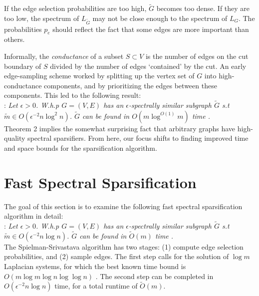 \documentclass{article}
\begin{document}
If the edge selection probabilities are too high, $\tilde{G}$ becomes too
dense. If they are too low, the spectrum of $L_{\tilde{G}}$ may not be close
enough to the spectrum of $L_G$. The probabilities $p_e$ should reflect the
fact that some edges are more important than others.

Informally, the \textit{conductance} of a subset $S \subset V$ is the number
of edges on the cut boundary of $S$ divided by the number of edges
`contained' by the cut.  An early edge-sampling scheme worked by splitting
up the vertex set of $G$ into high-conductance components, and by
prioritizing the edges between these components. This led to the following
result: \\

\noindent
{}: \textit{Let $\epsilon > 0$. W.h.p $G =
(V, E)$ has an $\epsilon$-spectrally similar subgraph $\tilde{G}$ s.t
$\tilde{m} \in O(\epsilon^{-2}n\log^2 n)$. $\tilde{G}$ can be found in
$O(m\log^{O(1)}m)$ time \cite{SpielmanTeng} \cite{TheSurvey}.} \\

Theorem 2 implies the somewhat surprising fact that arbitrary graphs have
high-quality spectral sparsifiers. From here, our focus shifts to finding
improved time and space bounds for the sparsification algorithm.

\section{Fast Spectral Sparsification}

The goal of this section is to examine the following fast spectral
sparsification algorithm in detail: \\

\noindent
{}: \textit{Let $\epsilon > 0$.
W.h.p $G = (V, E)$ has an $\epsilon$-spectrally similar subgraph $\tilde{G}$
s.t $\tilde{m} \in O(\epsilon^{-2}n\log n)$. $\tilde{G}$ can be found in
$\tilde{O}(m)$ time \cite{SpielmanSrivastava} \cite{TheSurvey}.} \\

The Spielman-Srivastava algorithm has two stages: (1) compute edge selection
probabilities, and (2) sample edges. The first step calls for the solution
of $\log m$ Laplacian systems, for which the best known time bound is $O(m
\log m \log n \log\log n)$ \cite{FastLaplacianSolver} \cite{TheSurvey}. The
second step can be completed in $O(\epsilon^{-2}n\log n)$ time, for a total
runtime of $\tilde{O}(m)$.
\end{document}

